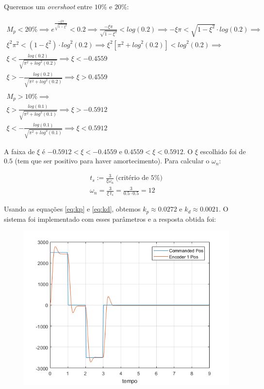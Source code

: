 \documentclass[a4paper,11pt]{article}
\begin{document}
Queremos um \textit{overshoot} entre $10\%$ e $20\%$:

\begin{gather*}
    M_p < 20\% \implies e^{\frac{-\xi \pi}{\sqrt{1 - \xi^2}}} < 0.2 \implies
        \frac{-\xi \pi}{\sqrt{1 - \xi^2}} < log\left(0.2\right) \implies
        -\xi \pi < \sqrt{1 - \xi^2} \cdot log\left(0.2\right) \implies \\
        \xi^2 \pi^2 < \left(1 - \xi^2\right) \cdot {log}^2\left(0.2\right)
        \implies \xi^2 \left[\pi^2 + {log}^2\left(0.2\right)\right] <
        {log}^2\left(0.2\right) \implies \\
    \xi < \frac{log\left(0.2\right)}
        {\sqrt{\pi^2 + {log}^2\left(0.2\right)}} \implies
        \xi < -0.4559 \\
    \xi > - \frac{log\left(0.2\right)}
        {\sqrt{\pi^2 + {log}^2\left(0.2\right)}} \implies
        \xi > 0.4559 \\ \\
    M_p > 10\% \implies \\
    \xi > \frac{log\left(0.1\right)}
        {\sqrt{\pi^2 + {log}^2\left(0.1\right)}} \implies
        \xi > -0.5912 \\
    \xi < - \frac{log\left(0.1\right)}
        {\sqrt{\pi^2 + {log}^2\left(0.1\right)}} \implies
        \xi < 0.5912
\end{gather*}

A faixa de $\xi$ é $-0.5912 < \xi < -0.4559$ e $0.4559 < \xi < 0.5912$.
O $\xi$ escolhido foi de $0.5$ (tem que ser positivo para haver amortecimento).
Para calcular o $\omega_n$:

\begin{gather*}
    t_s := \frac{3}{\xi \omega_n} ~ \text{(critério de 5\%)} \\
    \omega_n = \frac{3}{\xi ~ t_s} = \frac{3}{0.5 \cdot 0.5} = 12
\end{gather*}

Usando as equações \ref{eq:kp} e \ref{eq:kd}, obtemos $k_p \approx 0.0272$ e
$k_d \approx 0.0021$. O sistema foi implementado com esses parâmetros e a
resposta obtida foi:

\begin{figure}[H]
\includegraphics{q15}
\centering
\end{figure}
\end{document}
